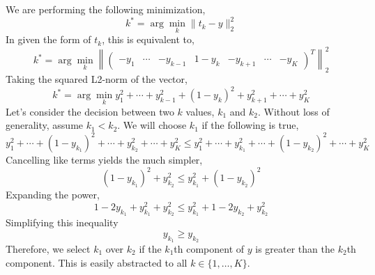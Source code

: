 \documentclass[12pt,twoside]{article}
\begin{document}
\begin{problems}
\begin{problemparts}
\end{problemparts}

\newpage

\problem  %

We are performing the following minimization,
$$ k^* = \arg\min_k \lVert t_k - y \rVert_2^2 $$
In given the form of $t_k$, this is equivalent to,
$$ k^* = \arg\min_k \left\lVert \begin{pmatrix} -y_1 & \cdots & -y_{k - 1} &
1 - y_k & -y_{k + 1} & \cdots & -y_K \end{pmatrix}^T \right\rVert_2^2 $$
Taking the squared L2-norm of the vector,
$$ k^* = \arg\min_k y_1^2 + \cdots + y_{k - 1}^2 + (1 - y_k)^2 + y_{k + 1}^2
+ \cdots + y_K^2 $$
Let's consider the decision between two $k$ values, $k_1$ and $k_2$. Without
loss of generality, assume $k_1 < k_2$. We will choose $k_1$ if the following
is true,
$$ y_1^2 + \cdots + (1 - y_{k_1})^2 + \cdots + y_{k_2}^2 + \cdots + y_K^2
\leq y_1^2 + \cdots + y_{k_1}^2 + \cdots + (1 - y_{k_2})^2 + \cdots + y_K^2 $$
Cancelling like terms yields the much simpler,
$$ (1 - y_{k_1})^2 + y_{k_2}^2 \leq y_{k_1}^2 + (1 - y_{k_2})^2 $$
Expanding the power,
$$ 1 - 2 y_{k_1} + y_{k_1}^2 + y_{k_2}^2 \leq y_{k_1}^2 + 1 - 2 y_{k_2} +
y_{k_2}^2 $$
Simplifying this inequality
$$ y_{k_1} \geq y_{k_2} $$
Therefore, we select $k_1$ over $k_2$ if the $k_1$th component of $y$ is
greater than the $k_2$th component. This is easily abstracted to all $k \in
\{1, \ldots, K\}$.


\end{problems}
\end{document}
